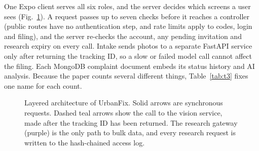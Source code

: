 \documentclass{ieeeaccess}
\begin{document}
One Expo client serves all six roles, and the server decides which screens a user sees (Fig.~\ref{fig:f3}). A request passes up to seven checks before it reaches a controller (public routes have no authentication step, and rate limits apply to codes, login and filing), and the server re-checks the account, any pending invitation and research expiry on every call. Intake sends photos to a separate FastAPI service only after returning the tracking ID, so a slow or failed model call cannot affect the filing. Each MongoDB complaint document embeds its status history and AI analysis. Because the paper counts several different things, Table~\ref{tab:t3} fixes one name for each count.

\begin{figure}[!t]
\centering
\resizebox{\textwidth}{!}{}
\caption{Layered architecture of UrbanFix. Solid arrows are synchronous requests. Dashed teal arrows show the call to the vision service, made after the tracking ID has been returned. The research gateway (purple) is the only path to bulk data, and every research request is written to the hash-chained access log.}
\label{fig:f3}
\end{figure}
\end{document}
